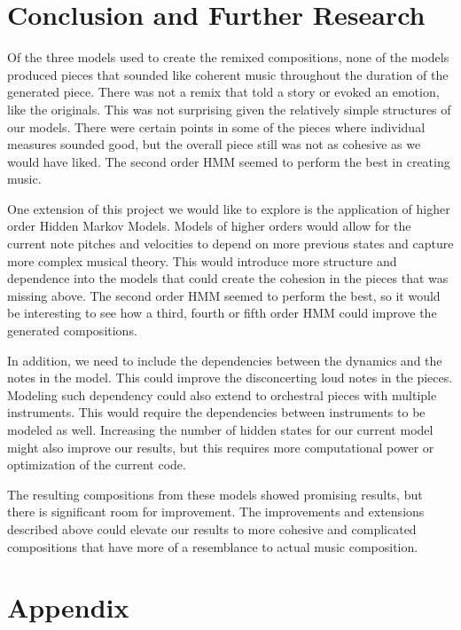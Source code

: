 \documentclass{article} %
\begin{document}
\section{Conclusion and Further Research}

Of the three models used to create the remixed compositions, none of the models produced pieces that sounded like coherent music throughout the duration of the generated piece. There was not a remix that told a story or evoked an emotion, like the originals. This was not surprising given the relatively simple structures of our models. There were certain points in some of the pieces where individual measures sounded good, but the overall piece still was not as cohesive as we would have liked. The second order HMM seemed to perform the best in creating music. 

One extension of this project we would like to explore is the application of higher order Hidden Markov Models. Models of higher orders would allow for the current note pitches and velocities to depend on more previous states and capture more complex musical theory. This would introduce more structure and dependence into the models that could create the cohesion in the pieces that was missing above. The second order HMM seemed to perform the best, so it would be interesting to see how a third, fourth or fifth order HMM could improve the generated compositions. 

In addition, we need to include the dependencies between the dynamics and the notes in the model. This could improve the disconcerting loud notes in the pieces. Modeling such dependency could also extend to orchestral pieces with multiple instruments. This would require the dependencies between instruments to be modeled as well. Increasing the number of hidden states for our current model might also improve our results, but this requires more computational power or optimization of the current code.

The resulting compositions from these models showed promising results, but there is significant room for improvement. The improvements and extensions described above could elevate our results to more cohesive and complicated compositions that have more of a resemblance to actual music composition. 


\newpage

\section{Appendix}
\end{document}
